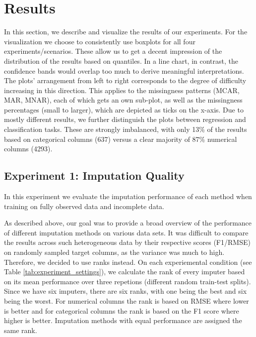 \section{Results}
\label{sec:results}

In this section, we describe and visualize the results of our experiments. For the visualization we choose to consistently use boxplots for all four experiments/scenarios. These allow us to get a decent impression of the distribution of the results based on quantiles. In a line chart, in contrast, the confidence bands would overlap too much to derive meaningful interpretations. The plots' arrangement from left to right corresponds to the degree of difficulty increasing in this direction. This applies to the missingness patterns (MCAR, MAR, MNAR), each of which gets an own sub-plot, as well as the missingness percentages (small to larger), which are depicted as ticks on the x-axis. Due to mostly different results, we further distinguish the plots between regression and classification tasks. These are strongly imbalanced, with only 13\% of the results based on categorical columns (637) versus a clear majority of 87\% numerical columns (4293).


\subsection{Experiment 1: Imputation Quality}

In this experiment we evaluate the imputation performance of each method when training on fully observed data and incomplete data.

As described above, our goal was to provide a broad overview of the performance of different imputation methods on various data sets. It was difficult to compare the results across such heterogeneous data by their respective scores (F1/RMSE) on randomly sampled target columns, as the variance was much to high. Therefore, we decided to use ranks instead. On each experiemental condition (see Table \ref{tab:experiment_settings}), we calculate the rank of every imputer based on its mean performance over three repetions (different random train-test splits). Since we have six imputers, there are six ranks, with one being the best and six being the worst. For numerical columns the rank is based on RMSE where lower is better and for categorical columns the rank is based on the F1 score where higher is better. Imputation methods with equal performance are assigned the same rank.

